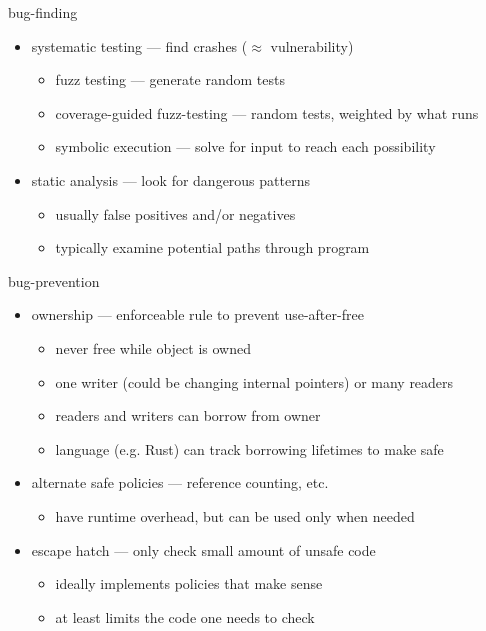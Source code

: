 \begin{frame}{bug-finding}
    \begin{itemize}
        \item systematic testing --- find crashes ($\approx$ vulnerability)
            \begin{itemize}
            \item fuzz testing --- generate random tests
            \item coverage-guided fuzz-testing --- random tests, weighted by what runs
            \item symbolic execution --- solve for input to reach each possibility
            \end{itemize}
        \item static analysis --- look for dangerous patterns
            \begin{itemize}
            \item usually false positives and/or negatives
            \item typically examine potential paths through program
            \end{itemize}
    \end{itemize}
\end{frame}

\begin{frame}{bug-prevention}
    \begin{itemize}
        \item ownership --- enforceable rule to prevent use-after-free
            \begin{itemize}
            \item never free while object is owned
            \item one writer (could be changing internal pointers) or many readers
            \item readers and writers can borrow from owner
            \item language (e.g. Rust) can track borrowing lifetimes to make safe
            \end{itemize}
        \item alternate safe policies --- reference counting, etc.
            \begin{itemize}
            \item have runtime overhead, but can be used only when needed
            \end{itemize}
        \item escape hatch --- only check small amount of unsafe code
            \begin{itemize}
            \item ideally implements policies that make sense
            \item at least limits the code one needs to check
            \end{itemize}
    \end{itemize}
\end{frame}

